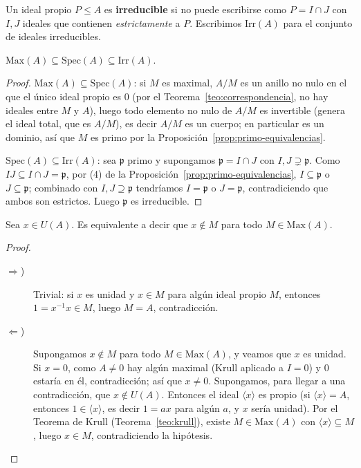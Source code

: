 \begin{definicion}
Un ideal propio $P\leq A$ es \textbf{irreducible} si no puede escribirse como $P=I\cap J$ con $I,J$ ideales que contienen \emph{estrictamente} a $P$. Escribimos $\mathrm{Irr}(A)$ para el conjunto de ideales irreducibles.
\end{definicion}

\begin{prop}
$\mathrm{Max}(A) \subseteq \mathrm{Spec}(A) \subseteq \mathrm{Irr}(A)$.
\end{prop}
\begin{proof}
$\mathrm{Max}(A)\subseteq \mathrm{Spec}(A)$: si $M$ es maximal, $A/M$ es un anillo no nulo en el que el único ideal propio es $0$ (por el Teorema~\ref{teo:correspondencia}, no hay ideales entre $M$ y $A$), luego todo elemento no nulo de $A/M$ es invertible (genera el ideal total, que es $A/M$), es decir $A/M$ es un cuerpo; en particular es un dominio, así que $M$ es primo por la Proposición~\ref{prop:primo-equivalencias}.

$\mathrm{Spec}(A)\subseteq \mathrm{Irr}(A)$: sea $\mathfrak p$ primo y supongamos $\mathfrak p = I\cap J$ con $I,J\supsetneq \mathfrak p$. Como $IJ\subseteq I\cap J=\mathfrak p$, por (4) de la Proposición~\ref{prop:primo-equivalencias}, $I\subseteq \mathfrak p$ o $J\subseteq \mathfrak p$; combinado con $I,J\supseteq \mathfrak p$ tendríamos $I=\mathfrak p$ o $J=\mathfrak p$, contradiciendo que ambos son estrictos. Luego $\mathfrak p$ es irreducible.
\end{proof}

\begin{lema}
Sea $x\in U(A)$. Es equivalente a decir que $x\notin M$ para todo $M\in \mathrm{Max}(A)$.
\end{lema}
\begin{proof}\
\begin{description}
    \item[$\Rightarrow$)] Trivial: si $x$ es unidad y $x\in M$ para algún ideal propio $M$, entonces $1=x^{-1}x\in M$, luego $M=A$, contradicción.
    \item[$\Leftarrow$)] Supongamos $x\notin M$ para todo $M\in \mathrm{Max}(A)$, y veamos que $x$ es unidad. Si $x=0$, como $A\neq 0$ hay algún maximal (Krull aplicado a $I=0$) y $0$ estaría en él, contradicción; así que $x\neq 0$. Supongamos, para llegar a una contradicción, que $x\notin U(A)$. Entonces el ideal $\langle x\rangle$ es propio (si $\langle x\rangle=A$, entonces $1\in \langle x\rangle$, es decir $1=ax$ para algún $a$, y $x$ sería unidad). Por el Teorema de Krull (Teorema~\ref{teo:krull}), existe $M\in \mathrm{Max}(A)$ con $\langle x\rangle \subseteq M$, luego $x\in M$, contradiciendo la hipótesis.
\end{description}
\end{proof}

